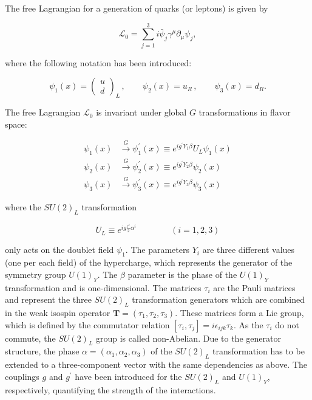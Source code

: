 The free Lagrangian for a generation of quarks (or leptons) is given by

\begin{equation}\label{eqn:SM_e12}
\mathcal{L}_0 = \sum_{j=1}^3 i\bar{\psi}_j\gamma^\mu\partial_\mu\psi_j,
\end{equation}

\noindent where the following notation has been introduced:

\begin{equation}\label{eqn:SM_e13}
\psi_1(x) = 
\begin{pmatrix}
  u \\ d
\end{pmatrix}_L
\,
,
\qquad
\psi_2(x) = u_R \, , \qquad \psi_3(x) = d_R.
\end{equation}

The free Lagrangian $\mathcal{L}_0$ is invariant under global $G$ transformations in flavor space:

\begin{equation}\label{eqn:SM_e14}
\begin{split}
\psi_1(x) & \xrightarrow{G} \psi_1^\prime(x) \equiv e^{ig^\prime Y_1\beta}U_L\psi_1(x) \\ 
\psi_2(x) & \xrightarrow{G} \psi_2^\prime(x) \equiv e^{ig^\prime Y_2\beta}\psi_2(x) \\
\psi_3(x) & \xrightarrow{G} \psi_3^\prime(x) \equiv e^{ig^\prime Y_3\beta}\psi_3(x)
\end{split}
\end{equation}

\noindent where the $SU(2)_L$ transformation

\begin{equation}\label{eqn:SM_e15}
U_L \equiv e^{ig\frac{\tau^i}{2}\alpha^i} \qquad\qquad (i = 1,2,3)
\end{equation}

\noindent only acts on the doublet field $\psi_1$.
The parameters $Y_i$ are three different values (one per each field) of the hypercharge, which represents the generator of the symmetry group $U(1)_Y$.
The $\beta$ parameter is the phase of the $U(1)_Y$ transformation and is one-dimensional.
The matrices $\tau_i$ are the Pauli matrices and represent the three $SU(2)_L$ transformation generators which are combined in the weak isospin operator
$\textbf{T} = (\tau_1, \tau_2, \tau_3)$. These matrices form a Lie group, which is defined by the commutator relation $[\tau_i,\tau_j] = i\epsilon_{ijk}\tau_k$.
As the $\tau_i$ do not commute, the $SU(2)_L$ group is called non-Abelian.
Due to the generator structure, the phase $\alpha = (\alpha_1, \alpha_2, \alpha_3)$ of the $SU(2)_L$ transformation has to be extended to a three-component vector with the same dependencies as above.
The couplings $g$ and $g^\prime$ have been introduced for the $SU(2)_L$ and $U(1)_Y$, respectively, quantifying the strength of the interactions.

